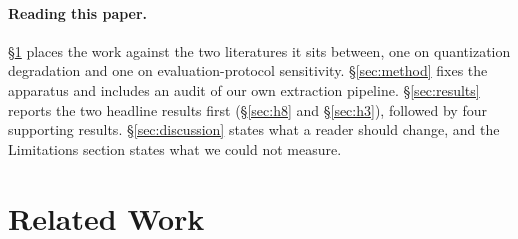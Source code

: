 \documentclass[conference]{IEEEtran}
\begin{document}

\paragraph{Reading this paper.}
\S\ref{sec:related} places the work against the two literatures it sits between,
one on quantization degradation and one on evaluation-protocol sensitivity.
\S\ref{sec:method} fixes the apparatus and includes an audit of our own
extraction pipeline. \S\ref{sec:results} reports the two headline results first
(\S\ref{sec:h8} and \S\ref{sec:h3}), followed by four supporting results. \S\ref{sec:discussion} states what a reader should change, and
the Limitations section states what we could not measure.

\section{Related Work}
\label{sec:related}
%
\end{document}
